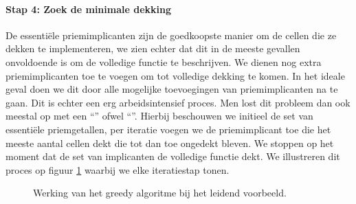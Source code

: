 \paragraph{Stap 4: Zoek de minimale dekking}
De essenti\"ele priemimplicanten zijn de goedkoopste manier om de cellen die ze dekken te implementeren, we zien echter dat dit in de meeste gevallen onvoldoende is om de volledige functie te beschrijven. We dienen nog extra priemimplicanten toe te voegen om tot volledige dekking te komen. In het ideale geval doen we dit door alle mogelijke toevoegingen van priemimplicanten na te gaan. Dit is echter een erg arbeidsintensief proces. Men lost dit probleem dan ook meestal op met een ``'' ofwel ``''. Hierbij beschouwen we initieel de set van essenti\"ele priemgetallen, per iteratie voegen we de priemimplicant toe die het meeste aantal cellen dekt die tot dan toe ongedekt bleven. We stoppen op het moment dat de set van implicanten de volledige functie dekt. We illustreren dit proces op figuur \ref{fig:karnaughKaartenVoorbeeldGreedySearch} waarbij we elke iteratiestap tonen.
\begin{figure}[hbt]
\centering
{}
\caption{Werking van het greedy algoritme bij het leidend voorbeeld.}
\label{fig:karnaughKaartenVoorbeeldGreedySearch}
\end{figure}
